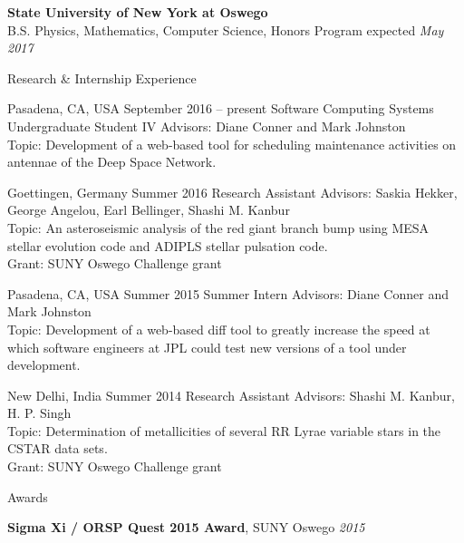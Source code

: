 \documentclass{resume} %
\begin{document}
\textbf{State University of New York at Oswego}
\\
B.S. Physics, Mathematics, Computer Science, Honors Program
\hfill
expected \emph{May 2017}

\begin{rSection}{Research \& Internship Experience}{}

           {Pasadena, CA, USA}
           {September 2016 -- present}
           {Software Computing Systems Undergraduate Student IV}
           {
    Advisors:
    Diane Conner and Mark Johnston
    \\
    Topic:
    Development of a web-based tool for scheduling maintenance activities on
    antennae of the Deep Space Network.
  }

           {Goettingen, Germany}
           {Summer 2016}
           {Research Assistant}
           {
    Advisors:
    Saskia Hekker, George Angelou, Earl Bellinger, Shashi M. Kanbur
    \\
    Topic:
    An asteroseismic analysis of the red giant branch bump using MESA stellar
    evolution code and ADIPLS stellar pulsation code.
    \\
    Grant:
    SUNY Oswego Challenge grant
  }

           {Pasadena, CA, USA}
           {Summer 2015}
           {Summer Intern}
           {
    Advisors:
    Diane Conner and Mark Johnston
    \\
    Topic:
    Development of a web-based diff tool to greatly increase the speed at which
    software engineers at JPL could test new versions of a tool under
    development.
  }

           {New Delhi, India}
           {Summer 2014}
           {Research Assistant}
           {
    Advisors:
    Shashi M. Kanbur, H. P. Singh
    \\
    Topic:
    Determination of metallicities of several RR Lyrae variable stars in the
    CSTAR data sets.
    \\
    Grant:
    SUNY Oswego Challenge grant
  }

\end{rSection}

\begin{rSection}{Awards}{}

  \textbf{Sigma Xi / ORSP Quest 2015 Award}, SUNY Oswego
  \hfill
  \emph{2015}

\end{rSection}
\end{document}
